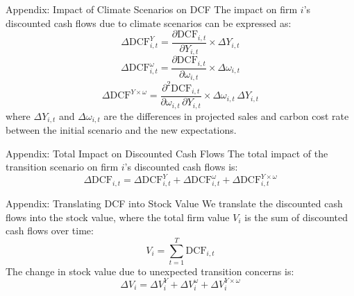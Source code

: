 \documentclass{beamer}
\begin{document}
\begin{frame}{Appendix: Impact of Climate Scenarios on DCF}
  The impact on firm $i$’s discounted cash flows due to climate scenarios can be expressed as:
  \begin{equation}
    \Delta \text{DCF}_{i,t}^Y = \frac{\partial \text{DCF}_{i,t}}{\partial Y_{i,t}} \times \Delta Y_{i,t}
  \end{equation}
  \begin{equation}
    \Delta \text{DCF}_{i,t}^\omega = \frac{\partial \text{DCF}_{i,t}}{\partial \omega_{i,t}} \times \Delta \omega_{i,t}
  \end{equation}
  \begin{equation}
    \Delta \text{DCF}^{Y \times \omega} = \frac{\partial^2 \text{DCF}_{i,t}}{\partial \omega_{i,t} \, \partial Y_{i,t}} \times \Delta \omega_{i,t} \, \Delta Y_{i,t}
  \end{equation}
  where $\Delta Y_{i,t}$ and $\Delta \omega_{i,t}$ are the differences in projected sales and carbon cost rate between the initial scenario and the new expectations.
\end{frame}

\begin{frame}{Appendix: Total Impact on Discounted Cash Flows}
  The total impact of the transition scenario on firm $i$'s discounted cash flows is:
  \begin{equation}
    \Delta \text{DCF}_{i,t} = \Delta \text{DCF}_{i,t}^Y + \Delta \text{DCF}_{i,t}^\omega + \Delta \text{DCF}_{i,t}^{Y \times \omega}
  \end{equation}
\end{frame}

\begin{frame}{Appendix: Translating DCF into Stock Value}
  We translate the discounted cash flows into the stock value, where the total firm value $V_i$ is the sum of discounted cash flows over time:
  \begin{equation}
    V_i = \sum_{t=1}^T \text{DCF}_{i,t}
  \end{equation}
  The change in stock value due to unexpected transition concerns is:
  \begin{equation}
    \Delta V_i = \Delta V_i^Y + \Delta V_i^\omega + \Delta V_i^{Y \times \omega}
  \end{equation}
\end{frame}
\end{document}
